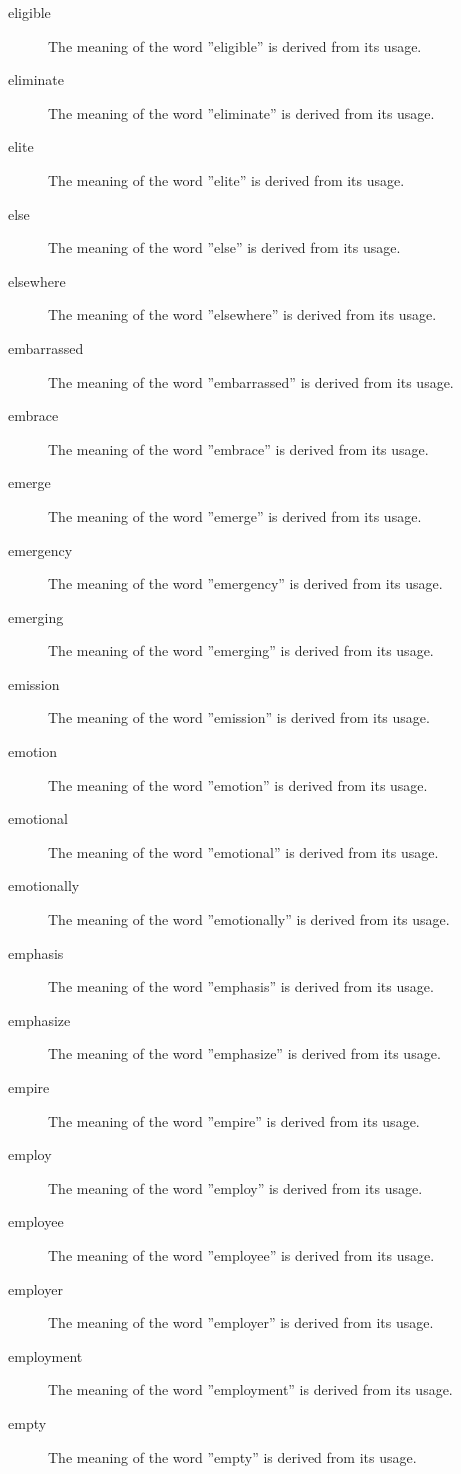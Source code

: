 \documentclass[12pt, letterpaper]{memoir}
\begin{document}
\begin{description}
\item[eligible] The meaning of the word ''eligible'' is derived from its usage.
\item[eliminate] The meaning of the word ''eliminate'' is derived from its usage.
\item[elite] The meaning of the word ''elite'' is derived from its usage.
\item[else] The meaning of the word ''else'' is derived from its usage.
\item[elsewhere] The meaning of the word ''elsewhere'' is derived from its usage.
\item[embarrassed] The meaning of the word ''embarrassed'' is derived from its usage.
\item[embrace] The meaning of the word ''embrace'' is derived from its usage.
\item[emerge] The meaning of the word ''emerge'' is derived from its usage.
\item[emergency] The meaning of the word ''emergency'' is derived from its usage.
\item[emerging] The meaning of the word ''emerging'' is derived from its usage.
\item[emission] The meaning of the word ''emission'' is derived from its usage.
\item[emotion] The meaning of the word ''emotion'' is derived from its usage.
\item[emotional] The meaning of the word ''emotional'' is derived from its usage.
\item[emotionally] The meaning of the word ''emotionally'' is derived from its usage.
\item[emphasis] The meaning of the word ''emphasis'' is derived from its usage.
\item[emphasize] The meaning of the word ''emphasize'' is derived from its usage.
\item[empire] The meaning of the word ''empire'' is derived from its usage.
\item[employ] The meaning of the word ''employ'' is derived from its usage.
\item[employee] The meaning of the word ''employee'' is derived from its usage.
\item[employer] The meaning of the word ''employer'' is derived from its usage.
\item[employment] The meaning of the word ''employment'' is derived from its usage.
\item[empty] The meaning of the word ''empty'' is derived from its usage.

\end{description}
\end{document}
